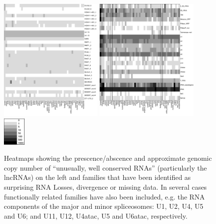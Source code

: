 \documentclass[10pt]{bmc_article}
\newenvironment{bmcformat}{\begin{raggedright}\baselineskip20pt\sloppy\setboolean{publ}{false}}{\end{raggedright}\baselineskip20pt\sloppy}
\begin{document}
\begin{bmcformat}
{
  } %


\clearpage
\newpage


\begin{figure}[ht]
  \includegraphics[width=0.45\textwidth]{figures/unusual-conserved.pdf}
  \includegraphics[width=0.45\textwidth]{figures/diverged.pdf}
  \includegraphics[width=0.1\textwidth]{figures/key2.pdf}
  \caption[]{Heatmaps showing the prescence/abscence and approximate
    genomic copy number of ``unusually, well conserved RNAs''
    (particularly the lncRNAs) on the left and families that have been
    identified as surprising RNA Losses, divergence or missing
    data. In several cases functionally related families have also
    been included, e.g. the RNA components of the major and minor
    spliceosomes: U1, U2, U4, U5 and U6; and U11, U12, U4atac, U5 and
    U6atac, respectively.}\label{fig:5}
\end{figure}



\end{bmcformat}
\end{document}
